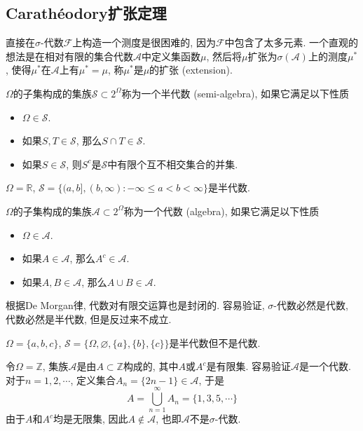 \documentclass[cn, 12pt, math=mtpro2, bibstyle=apa, blue, twocol]{elegantbook}
\newcommand{\F}{\mathcal{F}}
\newcommand{\R}{\mathbb{R}}
\let\emptyset\varnothing
\begin{document}
\subsection{Carathéodory扩张定理}

直接在$\sigma$-代数$\F$上构造一个测度是很困难的, 因为$\F$中包含了太多元素. 一个直观的想法是在相对有限的集合代数$\mathcal{A}$中定义集函数$\mu$, 然后将$\mu$扩张为$\sigma(\mathcal{A})$上的测度$\mu^\ast$, 使得$\mu^\ast$在$\mathcal{A}$上有$\mu^\ast=\mu$, 称$\mu^\ast$是$\mu$的扩张 (extension).

\begin{definition}
$\Omega$的子集构成的集族$\mathcal{S}\subset 2^\Omega$称为一个半代数 (semi-algebra), 如果它满足以下性质
\begin{itemize}
  \item $\Omega\in\mathcal{S}$.
  \item 如果$S,T\in \mathcal{S}$, 那么$S\cap T\in\mathcal{S}$.
  \item 如果$S\in\mathcal{S}$, 则$S^c$是$\mathcal{S}$中有限个互不相交集合的并集.
\end{itemize}
\end{definition}
\begin{example}
$\Omega=\R$, $\mathcal{S}=\{(a,b], (b,\infty): -\infty\leq a<b<\infty \}$是半代数.
\end{example}

\begin{definition}
$\Omega$的子集构成的集族$\mathcal{A}\subset 2^\Omega$称为一个代数 (algebra), 如果它满足以下性质
\begin{itemize}
  \item $\Omega\in\mathcal{A}$.
  \item 如果$A\in\mathcal{A}$, 那么$A^c\in\mathcal{A}$.
  \item 如果$A,B\in\mathcal{A}$, 那么$A\cup B\in\mathcal{A}$.
\end{itemize}
\end{definition}
根据De Morgan律, 代数对有限交运算也是封闭的. 容易验证, $\sigma$-代数必然是代数, 代数必然是半代数, 但是反过来不成立.
\begin{example}
$\Omega=\{a,b,c\}$, $\mathcal{S}=\{\Omega,\emptyset,\{a\},\{b\},\{c\}\}$是半代数但不是代数.
\end{example}

\begin{example}
令$\Omega=\mathbb{Z}$, 集族$\mathcal{A}$是由$A\subset\mathbb{Z}$构成的, 其中$A$或$A^c$是有限集. 容易验证$\mathcal{A}$是一个代数. 对于$n=1,2,\cdots$, 定义集合$A_n=\{2n-1\}\in\mathcal{A}$, 于是
$$A=\bigcup_{n=1}^\infty A_n=\{1,3,5,\cdots\}$$
由于$A$和$A^c$均是无限集, 因此$A\notin\mathcal{A}$, 也即$\mathcal{A}$不是$\sigma$-代数.
\end{example}
\end{document}
